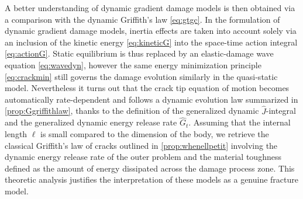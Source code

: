 A better understanding of dynamic gradient damage models is then obtained via a comparison with the dynamic Griffith's law \eqref{eq:gtgc}. In the formulation of dynamic gradient damage models, inertia effects are taken into account solely via an inclusion of the kinetic energy \eqref{eq:kineticG} into the space-time action integral \eqref{eq:actionG}. Static equilibrium is thus replaced by an elastic-damage wave equation \eqref{eq:wavedyn}, however the same energy minimization principle \eqref{eq:crackmin} still governs the damage evolution similarly in the quasi-static model. Nevertheless it turns out that the crack tip equation of motion becomes automatically rate-dependent and follows a dynamic evolution law summarized in \cref{prop:Ggriffithlaw}, thanks to the definition of the generalized dynamic $\widehat{J}$-integral and the generalized dynamic energy release rate $\widehat{G}_t$. Assuming that the internal length $\ell$ is small compared to the dimension of the body, we retrieve the classical Griffith's law of cracks outlined in \cref{prop:whenellpetit} involving the dynamic energy release rate of the outer problem and the material toughness defined as the amount of energy dissipated across the damage process zone. This theoretic analysis justifies the interpretation of these models as a genuine fracture model.